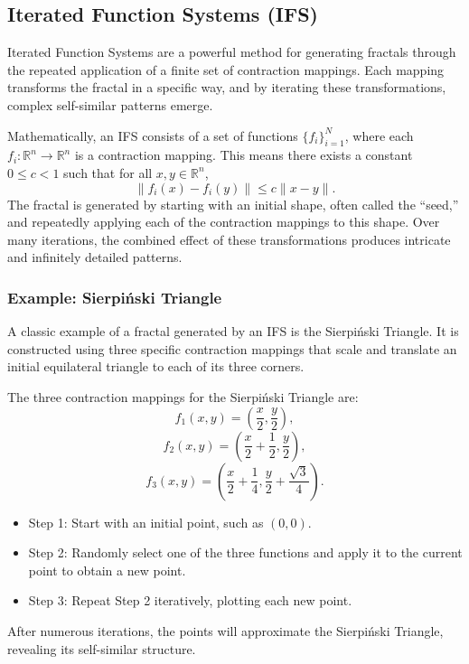 \documentclass[12pt]{article}
\begin{document}
\subsection{Iterated Function Systems (IFS)}
Iterated Function Systems are a powerful method for generating fractals through the repeated application of a finite set of contraction mappings. Each mapping transforms the fractal in a specific way, and by iterating these transformations, complex self-similar patterns emerge.

Mathematically, an IFS consists of a set of functions \( \{f_i\}_{i=1}^N \), where each \( f_i: \mathbb{R}^n \to \mathbb{R}^n \) is a contraction mapping. This means there exists a constant \( 0 \leq c < 1 \) such that for all \( x, y \in \mathbb{R}^n \),
\[
\| f_i(x) - f_i(y) \| \leq c \| x - y \|.
\]
The fractal is generated by starting with an initial shape, often called the ``seed,'' and repeatedly applying each of the contraction mappings to this shape. Over many iterations, the combined effect of these transformations produces intricate and infinitely detailed patterns.

\subsubsection{Example: Sierpiński Triangle}
A classic example of a fractal generated by an IFS is the Sierpiński Triangle. It is constructed using three specific contraction mappings that scale and translate an initial equilateral triangle to each of its three corners.

The three contraction mappings for the Sierpiński Triangle are:
\[
f_1(x, y) = \left( \frac{x}{2}, \frac{y}{2} \right),
\]
\[
f_2(x, y) = \left( \frac{x}{2} + \frac{1}{2}, \frac{y}{2} \right),
\]
\[
f_3(x, y) = \left( \frac{x}{2} + \frac{1}{4}, \frac{y}{2} + \frac{\sqrt{3}}{4} \right).
\]

\begin{itemize}
    \item Step 1: Start with an initial point, such as \( (0,0) \).
    \item Step 2: Randomly select one of the three functions and apply it to the current point to obtain a new point.
    \item Step 3: Repeat Step 2 iteratively, plotting each new point.
\end{itemize}

After numerous iterations, the points will approximate the Sierpiński Triangle, revealing its self-similar structure. 
\end{document}
